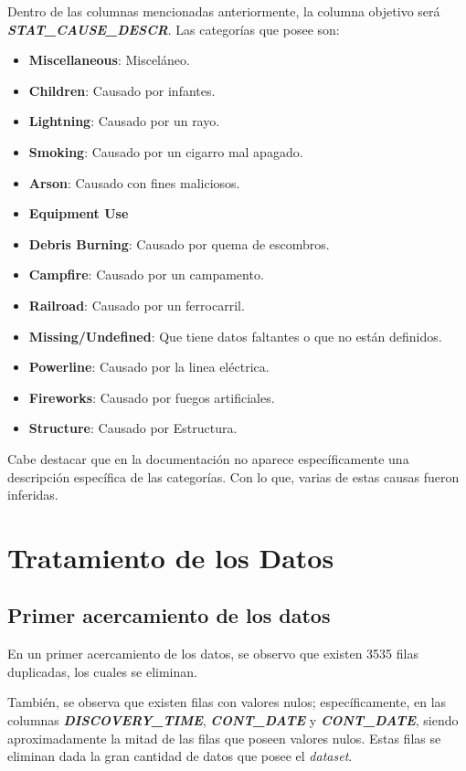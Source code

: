 Dentro de las columnas mencionadas anteriormente, la columna objetivo será \textit{\textbf{STAT\_CAUSE\_DESCR}}. Las categorías que posee son:
\begin{itemize}
    \item \textbf{Miscellaneous}: Misceláneo.
    \item \textbf{Children}: Causado por infantes.
    \item \textbf{Lightning}: Causado por un rayo.
    \item \textbf{Smoking}: Causado por un cigarro mal apagado.
    \item \textbf{Arson}: Causado con fines maliciosos.
    \item \textbf{Equipment Use}
    \item \textbf{Debris Burning}: Causado por quema de escombros.
    \item \textbf{Campfire}: Causado por un campamento.
    \item \textbf{Railroad}: Causado por un ferrocarril.
    \item \textbf{Missing/Undefined}: Que tiene datos faltantes o que no están definidos.
    \item \textbf{Powerline}: Causado por la linea eléctrica.
    \item \textbf{Fireworks}: Causado por fuegos artificiales.
    \item \textbf{Structure}: Causado por Estructura.
\end{itemize}

Cabe destacar que en la documentación no aparece específicamente una descripción específica de las categorías. Con lo que, varias de estas causas fueron inferidas.

\section{Tratamiento de los Datos}
\subsection{Primer acercamiento de los datos}
En un primer acercamiento de los datos, se observo que existen 3535 filas duplicadas, los cuales se eliminan. 

También, se observa que existen filas con valores nulos; específicamente, en las columnas \textit{\textbf{DISCOVERY\_TIME}}, \textit{\textbf{CONT\_DATE}} y \textit{\textbf{CONT\_DATE}}, siendo aproximadamente la mitad de las filas que poseen valores nulos. Estas filas se eliminan dada la gran cantidad de datos que posee el \textit{dataset}. 

